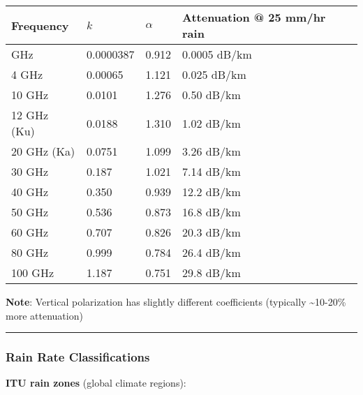 {\def\LTcaptype{} %
\begin{longtable}[]{@{}llll@{}}
\toprule\noalign{}
Frequency & \(k\) & \(\alpha\) & Attenuation @ 25 mm/hr rain \\
\midrule\noalign{}
\endhead
\bottomrule\noalign{}
\endlastfoot
1 GHz & 0.0000387 & 0.912 & 0.0005 dB/km \\
4 GHz & 0.00065 & 1.121 & 0.025 dB/km \\
10 GHz & 0.0101 & 1.276 & 0.50 dB/km \\
12 GHz (Ku) & 0.0188 & 1.310 & 1.02 dB/km \\
20 GHz (Ka) & 0.0751 & 1.099 & 3.26 dB/km \\
30 GHz & 0.187 & 1.021 & 7.14 dB/km \\
40 GHz & 0.350 & 0.939 & 12.2 dB/km \\
50 GHz & 0.536 & 0.873 & 16.8 dB/km \\
60 GHz & 0.707 & 0.826 & 20.3 dB/km \\
80 GHz & 0.999 & 0.784 & 26.4 dB/km \\
100 GHz & 1.187 & 0.751 & 29.8 dB/km \\
\end{longtable}
}

\textbf{Note}: Vertical polarization has slightly different coefficients
(typically \textasciitilde10-20\% more attenuation)

\begin{center}\rule{0.5\linewidth}{0.5pt}\end{center}

\subsubsection{Rain Rate
Classifications}\label{rain-rate-classifications}

\textbf{ITU rain zones} (global climate regions):

